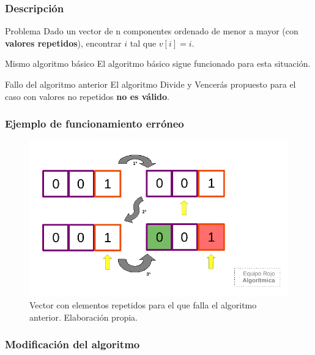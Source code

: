 \documentclass[13pt]{beamer}
\begin{document}
    \begin{frame}
        \frametitle{Descripción}
        \begin{block}{Problema}
            Dado un vector de n componentes ordenado de menor a mayor (con \textbf{valores repetidos}), 
            encontrar $i$ tal que $v[i] = i$. 
        \end{block}

        \begin{block}{Mismo algoritmo básico}
            El algoritmo básico sigue funcionado para esta situación.
        \end{block}

        \begin{alertblock}{Fallo del algoritmo anterior}
            El algoritmo Divide y Vencerás propuesto para el caso con valores no repetidos \textbf{no es válido}.
        \end{alertblock}
    \end{frame}

    \begin{frame}
        \frametitle{Ejemplo de funcionamiento erróneo}
        \begin{figure}
            \centering
            \includegraphics[scale=0.81]{img/esquema_fallo1a.pdf}
            \caption{Vector con elementos repetidos para el que falla 
            el algoritmo anterior. Elaboración propia.}
            \label{fig:fallo-1a}
        \end{figure}
    \end{frame}

    \begin{frame}
        \frametitle{Modificación del algoritmo}

        
    \end{frame}
\end{document}
